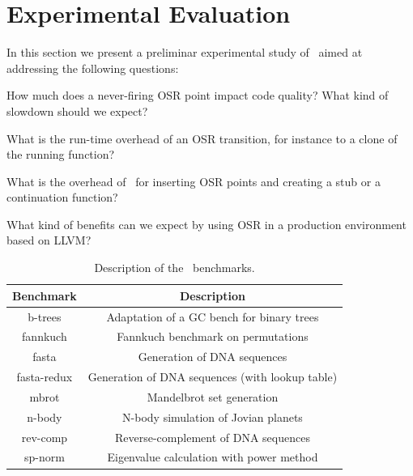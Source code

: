 
\section{Experimental Evaluation}
\label{se:experiments}

In this section we present a preliminar experimental study of \osrkit\ aimed at addressing the following questions:
\ifdefined \noauthorea
\begin{description}
\else
\begin{description}
\fi
\item[Q1] How much does a never-firing OSR point impact code quality? What kind of slowdown should we expect?
\item[Q2] What is the run-time overhead of an OSR transition, for instance to a clone of the running function?
\item[Q3] What is the overhead of \osrkit\ for inserting OSR points and creating a stub or a continuation function?
\item[Q4] What kind of benefits can we expect by using OSR in a production environment based on LLVM?
\end{description}

\begin{table}[t]
\begin{center}
\begin{small}
\ifdefined \noauthorea
    \begin{adjustbox}{width=1\columnwidth}
\fi
    \begin{tabular}{ |c|c| }
        \hline
        Benchmark & Description \\ 
        \hline
        \hline
        b-trees & Adaptation of a GC bench for binary trees \\ 
        \hline
        fannkuch & Fannkuch benchmark on permutations \\ 
        \hline
        fasta & Generation of DNA sequences \\ 
        \hline
        fasta-redux & Generation of DNA sequences (with lookup table) \\ 
        \hline
        mbrot & Mandelbrot set generation \\ 
        \hline
        n-body & N-body simulation of Jovian planets \\ 
        \hline
        rev-comp & Reverse-complement of DNA sequences \\ 
        \hline
        sp-norm & Eigenvalue calculation with power method \\ 
        \hline
    \end{tabular} 
\ifdefined \noauthorea
    \end{adjustbox}
\fi
\end{small}
\end{center}
\caption{\label{tab:shootout} Description of the \shootout\ benchmarks.} 
\end{table}


\end{description}
